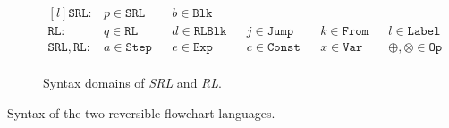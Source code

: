 \begin{figure}[]
  \begin{subfigure}{\textwidth}
    \center
    $$\begin{matrix*}[l]
      \mathtt{SRL}:     & {p}\in\mathtt{SRL}  & & {b}\in\mathtt{Blk}\\
      \mathtt{RL}:      & {q}\in\mathtt{RL}   & & {d}\in\mathtt{RLBlk} & & {j}\in\mathtt{Jump}  & & {k}\in\mathtt{From} & & {l}\in\mathtt{Label}\\
      \mathtt{SRL, RL}: & {a}\in\mathtt{Step} & &  e\in\mathtt{Exp}   & & {c}\in\mathtt{Const} & & {x}\in\mathtt{Var}  & & \oplus,\otimes\in\mathtt{Op}\\
    \end{matrix*}$$
    \caption{Syntax domains of \textit{SRL} and \textit{RL}.}
  \end{subfigure}

  \caption{Syntax of the two reversible flowchart languages.}
  \label{fig:rl_srl_grammar_and_structure}

\end{figure}
